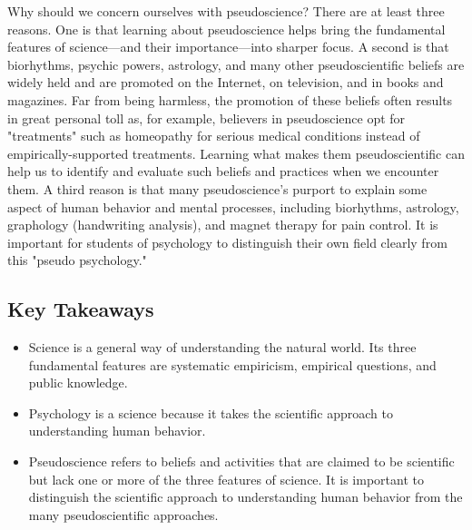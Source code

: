 Why should we concern ourselves with pseudoscience? There are at least three reasons. One is that learning about pseudoscience helps bring the fundamental features of science---and their importance---into sharper focus. A second is that biorhythms, psychic powers, astrology, and many other pseudoscientific beliefs are widely held and are promoted on the Internet, on television, and in books and magazines. Far from being harmless, the promotion of these beliefs often results in great personal toll as, for example, believers in pseudoscience opt for "treatments" such as homeopathy for serious medical conditions instead of empirically-supported treatments. Learning what makes them pseudoscientific can help us to identify and evaluate such beliefs and practices when we encounter them. A third reason is that many pseudoscience's purport to explain some aspect of human behavior and mental processes, including biorhythms, astrology, graphology (handwriting analysis), and magnet therapy for pain control. It is important for students of psychology to distinguish their own field clearly from this "pseudo psychology."

\subsection{Key Takeaways}
\begin{fullwidth}
\begin{itemize}
\item Science is a general way of understanding the natural world. Its three fundamental features are systematic empiricism, empirical questions, and public knowledge.
\item Psychology is a science because it takes the scientific approach to understanding human behavior.
\item Pseudoscience refers to beliefs and activities that are claimed to be scientific but lack one or more
of the three features of science. It is important to distinguish the scientific approach to understanding human behavior from the many pseudoscientific approaches.
\end{itemize}
\end{fullwidth}

